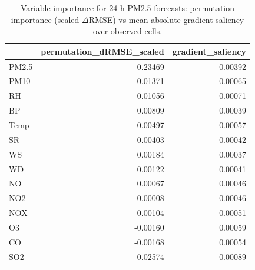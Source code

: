 \begin{table}
\caption{Variable importance for 24 h PM2.5 forecasts: permutation importance (scaled $\Delta$RMSE) vs mean absolute gradient saliency over observed cells.}
\label{tab:importance}
\begin{tabular}{lrr}
\toprule
 & permutation\_dRMSE\_scaled & gradient\_saliency \\
\midrule
PM2.5 & 0.23469 & 0.00392 \\
PM10 & 0.01371 & 0.00065 \\
RH & 0.01056 & 0.00071 \\
BP & 0.00809 & 0.00039 \\
Temp & 0.00497 & 0.00057 \\
SR & 0.00403 & 0.00042 \\
WS & 0.00184 & 0.00037 \\
WD & 0.00122 & 0.00041 \\
NO & 0.00067 & 0.00046 \\
NO2 & -0.00008 & 0.00046 \\
NOX & -0.00104 & 0.00051 \\
O3 & -0.00160 & 0.00059 \\
CO & -0.00168 & 0.00054 \\
SO2 & -0.02574 & 0.00089 \\
\bottomrule
\end{tabular}
\end{table}
